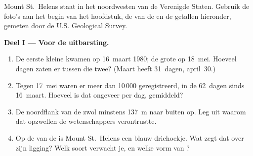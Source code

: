 \begin{problem}
\label{pb:g7:volcanoes:1}

Mount St.~Helens staat in het noordwesten van de Verenigde Staten. Gebruik
de foto's aan het begin van het hoofdstuk, de  van de  en de
getallen hieronder, gemeten door de U.S. Geological Survey.

\medskip
\noindent\textbf{Deel I --- Voor de uitbarsting.}
\begin{enumerate}
  \item De eerste kleine  kwamen op 16~maart 1980; de grote
         op 18~mei. Hoeveel dagen zaten er tussen die twee? (Maart
        heeft 31~dagen, april~30.)
  \item Tegen 17~mei waren er meer dan 10\,000  geregistreerd,
        in de 62~dagen sinds 16~maart. Hoeveel is dat ongeveer per dag,
        gemiddeld?
  \item De noordflank van de  zwol minstens \qty{137}{m} naar buiten op.
        Leg uit waarom dat opzwellen de wetenschappers verontrustte.
  \item Op de  van de  is Mount St.~Helens een blauw driehoekje.
        Wat zegt dat over zijn ligging? Welk soort  verwacht je,
        en welke vorm van ?
\end{enumerate}


\end{problem}
